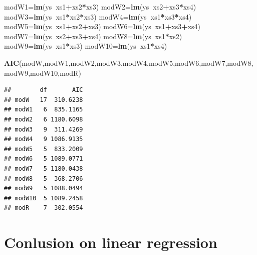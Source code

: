 \documentclass[
]{book}
\newenvironment{Shaded}{\begin{snugshade}}{\end{snugshade}}
\newcommand{\KeywordTok}[1]{\textcolor[rgb]{0.13,0.29,0.53}{\textbf{#1}}}
\newcommand{\NormalTok}[1]{#1}
\newcommand{\OperatorTok}[1]{\textcolor[rgb]{0.81,0.36,0.00}{\textbf{#1}}}
\begin{document}
\begin{Shaded}
\begin{Highlighting}[]
\NormalTok{modW1=}\KeywordTok{lm}\NormalTok{(ys}\OperatorTok{~}\NormalTok{xs1}\OperatorTok{+}\NormalTok{xs2}\OperatorTok{*}\NormalTok{xs3)}
\NormalTok{modW2=}\KeywordTok{lm}\NormalTok{(ys}\OperatorTok{~}\NormalTok{xs2}\OperatorTok{+}\NormalTok{xs3}\OperatorTok{*}\NormalTok{xs4)}
\NormalTok{modW3=}\KeywordTok{lm}\NormalTok{(ys}\OperatorTok{~}\NormalTok{xs1}\OperatorTok{*}\NormalTok{xs2}\OperatorTok{*}\NormalTok{xs3)}
\NormalTok{modW4=}\KeywordTok{lm}\NormalTok{(ys}\OperatorTok{~}\NormalTok{xs1}\OperatorTok{*}\NormalTok{xs3}\OperatorTok{*}\NormalTok{xs4)}
\NormalTok{modW5=}\KeywordTok{lm}\NormalTok{(ys}\OperatorTok{~}\NormalTok{xs1}\OperatorTok{+}\NormalTok{xs2}\OperatorTok{+}\NormalTok{xs3)}
\NormalTok{modW6=}\KeywordTok{lm}\NormalTok{(ys}\OperatorTok{~}\NormalTok{xs1}\OperatorTok{+}\NormalTok{xs3}\OperatorTok{+}\NormalTok{xs4)}
\NormalTok{modW7=}\KeywordTok{lm}\NormalTok{(ys}\OperatorTok{~}\NormalTok{xs2}\OperatorTok{+}\NormalTok{xs3}\OperatorTok{+}\NormalTok{xs4)}
\NormalTok{modW8=}\KeywordTok{lm}\NormalTok{(ys}\OperatorTok{~}\NormalTok{xs1}\OperatorTok{*}\NormalTok{xs2)}
\NormalTok{modW9=}\KeywordTok{lm}\NormalTok{(ys}\OperatorTok{~}\NormalTok{xs1}\OperatorTok{*}\NormalTok{xs3)}
\NormalTok{modW10=}\KeywordTok{lm}\NormalTok{(ys}\OperatorTok{~}\NormalTok{xs1}\OperatorTok{*}\NormalTok{xs4)}
\end{Highlighting}
\end{Shaded}

\begin{Shaded}
\begin{Highlighting}[]
\KeywordTok{AIC}\NormalTok{(modW,modW1,modW2,modW3,modW4,modW5,modW6,modW7,modW8,modW9,modW10,modR)}
\end{Highlighting}
\end{Shaded}

\begin{verbatim}
##        df       AIC
## modW   17  310.6238
## modW1   6  835.1165
## modW2   6 1180.6098
## modW3   9  311.4269
## modW4   9 1086.9135
## modW5   5  833.2009
## modW6   5 1089.0771
## modW7   5 1180.0438
## modW8   5  368.2706
## modW9   5 1088.0494
## modW10  5 1089.2458
## modR    7  302.0554
\end{verbatim}

\hypertarget{conlusion-on-linear-regression}{%
\chapter{Conlusion on linear regression}\label{conlusion-on-linear-regression}}
\end{document}
